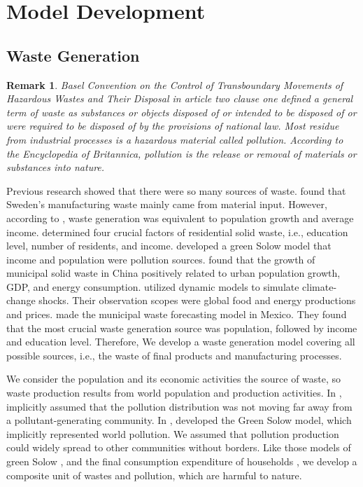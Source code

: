 \documentclass[sn-basic]{sn-jnl}%
\theoremstyle{thmstyleone}%
\theoremstyle{thmstyletwo}%
\newtheorem{remark}{Remark}%
\theoremstyle{thmstylethree}%
\begin{document}
\section{Model Development}
\subsection{Waste Generation}
\begin{remark}
Basel Convention on the Control of Transboundary Movements of Hazardous Wastes and Their Disposal \citep{law1989basel} in article two clause one defined a general term of waste as \emph{substances or objects disposed of or intended to be disposed of or were required to be disposed of by the provisions of national law}. Most residue from industrial processes is a hazardous material called pollution. According to the Encyclopedia of Britannica, pollution is the release or removal of materials or substances into nature.
\end{remark}

Previous research showed that there were so many sources of waste. \citet{bruvoll1997future} found that Sweden's manufacturing waste mainly came from material input. However, according to \citet{bandara2007relation}, waste generation was equivalent to population growth and average income. \citet{benitez2008mathematical} determined four crucial factors of residential solid waste, i.e., education level, number of residents, and income. \citet{brock2010green} developed a green Solow model that income and population were pollution sources. \citet{chhay2018municipal} found that the growth of municipal solid waste in China positively related to urban population growth, GDP, and energy consumption. \citet{pasqualino2019integrated} utilized dynamic models to simulate climate-change shocks. Their observation scopes were global food and energy productions and prices. \citet{araiza2020forecast} made the municipal waste forecasting model in Mexico. They found that the most crucial waste generation source was population, followed by income and education level. Therefore, We develop a waste generation model covering all possible sources, i.e., the waste of final products and manufacturing processes.

We consider the population and its economic activities the source of waste, so waste production results from world population and production activities. In \citeyear{copeland1994north}, \citeauthor{copeland1994north} implicitly assumed that the pollution distribution was not moving far away from a pollutant-generating community. In \citeyear{brock2010green}, \citeauthor{brock2010green} developed the Green Solow model, which implicitly represented world pollution. We assumed that pollution production could widely spread to other communities without borders. Like those models of green Solow \citep{brock2010green}, and the final consumption expenditure of households \citep{mazzanti2008waste}, we develop a composite unit of wastes and pollution, which are harmful to nature.
\end{document}
